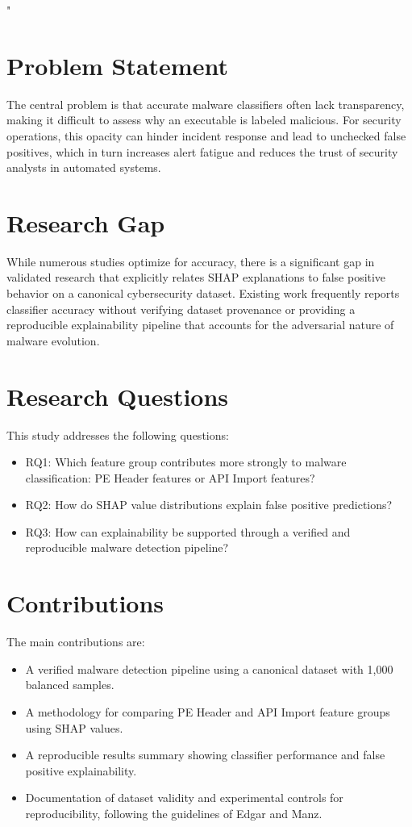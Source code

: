 "\documentclass[conference]{IEEEtran}
\begin{document}
\section{Problem Statement}
The central problem is that accurate malware classifiers often lack transparency, making it difficult to assess why an executable is labeled malicious. For security operations, this opacity can hinder incident response and lead to unchecked false positives, which in turn increases alert fatigue and reduces the trust of security analysts in automated systems.

\section{Research Gap}
While numerous studies optimize for accuracy, there is a significant gap in validated research that explicitly relates SHAP explanations to false positive behavior on a canonical cybersecurity dataset. Existing work frequently reports classifier accuracy without verifying dataset provenance or providing a reproducible explainability pipeline that accounts for the adversarial nature of malware evolution.

\section{Research Questions}
This study addresses the following questions:
\begin{itemize}
    \item RQ1: Which feature group contributes more strongly to malware classification: PE Header features or API Import features?
    \item RQ2: How do SHAP value distributions explain false positive predictions?
    \item RQ3: How can explainability be supported through a verified and reproducible malware detection pipeline?
\end{itemize}

\section{Contributions}
The main contributions are:
\begin{itemize}
    \item A verified malware detection pipeline using a canonical dataset with 1,000 balanced samples.
    \item A methodology for comparing PE Header and API Import feature groups using SHAP values.
    \item A reproducible results summary showing classifier performance and false positive explainability.
    \item Documentation of dataset validity and experimental controls for reproducibility, following the guidelines of Edgar and Manz.
\end{itemize}
\end{document}
